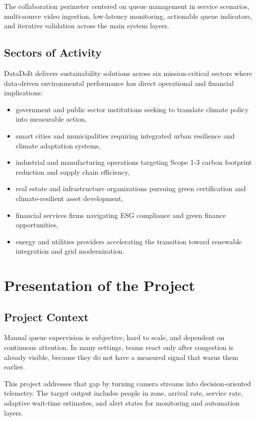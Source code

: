 The collaboration perimeter centered on queue management in service scenarios, multi-source video ingestion, low-latency monitoring, actionable queue indicators, and iterative validation across the main system layers.

\subsection{Sectors of Activity}
DataDoIt delivers sustainability solutions across six mission-critical sectors where data-driven environmental performance has direct operational and financial implications:
\begin{itemize}
    \item government and public sector institutions seeking to translate climate policy into measurable action,
    \item smart cities and municipalities requiring integrated urban resilience and climate adaptation systems,
    \item industrial and manufacturing operations targeting Scope 1-3 carbon footprint reduction and supply chain efficiency,
    \item real estate and infrastructure organizations pursuing green certification and climate-resilient asset development,
    \item financial services firms navigating ESG compliance and green finance opportunities,
    \item energy and utilities providers accelerating the transition toward renewable integration and grid modernization.
\end{itemize}

\section{Presentation of the Project}

\subsection{Project Context}
Manual queue supervision is subjective, hard to scale, and dependent on continuous attention. In many settings, teams react only after congestion is already visible, because they do not have a measured signal that warns them earlier.

This project addresses that gap by turning camera streams into decision-oriented telemetry. The target output includes people in zone, arrival rate, service rate, adaptive wait-time estimates, and alert states for monitoring and automation layers.


